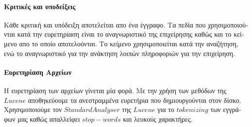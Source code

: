     \paragraph{\textgreek{Κριτικές και υποδείξεις}} {
        \textgreek{
            Κάθε κριτική και υπόδειξη αποτελείται απο ένα έγγραφο. Τα πεδία
            που χρησιμοποιούνται κατά την ευρετηρίαση είναι το αναγνωριστικό
            της επιχείρησης καθώς και το κείμενο απο το οποίο αποτελούνται.
            Το κείμενο χρησιμοποιείται κατά την αναζήτηση, ενώ το
            αναγνωριστικό για την ανάκτηση λοιπών πληροφοριών για την επιχείρηση.
        }
    \paragraph{\textgreek{Ευρετηρίαση Αρχείων}}{
        \textgreek{
            Η ευρετηρίαση των αρχείων γίνεται μία φορά. Με την χρήση των μεθόδων της
            $Lucene$ αποθηκεύουμε τα ανεστραμμένα ευρετήρια που δημιουργούνται στον δίσκο.
            \newline Χρησιμοποιούμε τον $StandardAnalyser$ της $Lucene$ για το $tokenizing$ των εγγράφων μας
            καθώς απαλλείφει $stop-words$ και λευκούς χαρακτήρες.
        }
    }
}
